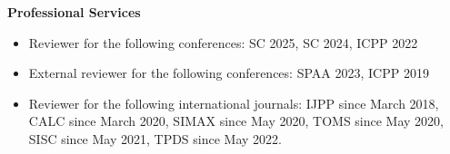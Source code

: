 \documentclass[letterpaper,11pt]{article}
\newcommand{\resheading}[1]{{\large \colorbox{mygrey}{\begin{minipage}{\textwidth}{\textbf{#1 \vphantom{p\^{E}}}}\end{minipage}}}}
\begin{document}
\vspace{0.1in}
\resheading{Professional Services}
\begin{itemize}
	\item Reviewer for the following conferences: SC 2025, SC 2024, ICPP 2022
	\item External reviewer for the following conferences: SPAA 2023, ICPP 2019
	\item Reviewer for the following international journals: IJPP since March 2018, CALC since March 2020, SIMAX since May 2020, TOMS since May 2020, SISC since May 2021, TPDS since May 2022.
\end{itemize}


\end{document}
